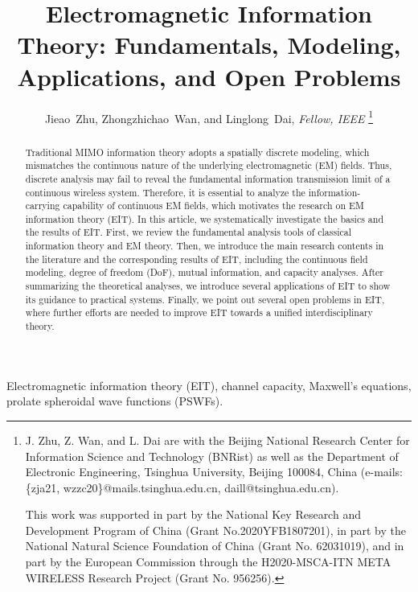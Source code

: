 \documentclass[journal,twocolumn]{IEEEtran}
\begin{document}
\title{Electromagnetic Information Theory: Fundamentals, Modeling, Applications, and Open Problems}

\author{{Jieao~Zhu, Zhongzhichao~Wan, and Linglong~Dai, {\textit{Fellow, IEEE}}}
\thanks{J. Zhu, Z. Wan, and L. Dai are with the Beijing National Research Center for Information Science and Technology (BNRist) as well as the Department of Electronic Engineering, Tsinghua University, Beijing 100084, China (e-mails: \{zja21, wzzc20\}@mails.tsinghua.edu.cn, daill@tsinghua.edu.cn).

This work was supported in part by the National Key Research and Development Program of China (Grant No.2020YFB1807201), in part by the National Natural Science Foundation of China (Grant No. 62031019), and in part by the European Commission through the H2020-MSCA-ITN META WIRELESS Research Project (Grant No. 956256).}
}

\maketitle

\begin{abstract}
	Traditional MIMO information theory adopts a spatially discrete modeling, which mismatches the continuous nature of the underlying electromagnetic (EM) fields.
	Thus, discrete analysis may fail to reveal the fundamental information transmission limit of a continuous wireless system.    
 	Therefore, it is essential to analyze the information-carrying capability of continuous EM fields, which motivates the research on EM information theory (EIT). In this article, we systematically investigate the basics and the results of EIT. First, we review the fundamental analysis tools of classical information theory and EM theory. Then, we introduce the main research contents in the literature and the corresponding results of EIT, including the continuous field modeling, degree of freedom (DoF), mutual information, and capacity analyses. After summarizing the theoretical analyses, we introduce several applications of EIT to show its guidance to practical systems. Finally, we point out several open problems in EIT, where further efforts are needed to improve EIT towards a unified interdisciplinary theory.
\end{abstract}

\begin{IEEEkeywords}
    Electromagnetic information theory (EIT), channel capacity, Maxwell's equations, prolate spheroidal wave functions (PSWFs). 
\end{IEEEkeywords}
\end{document}
